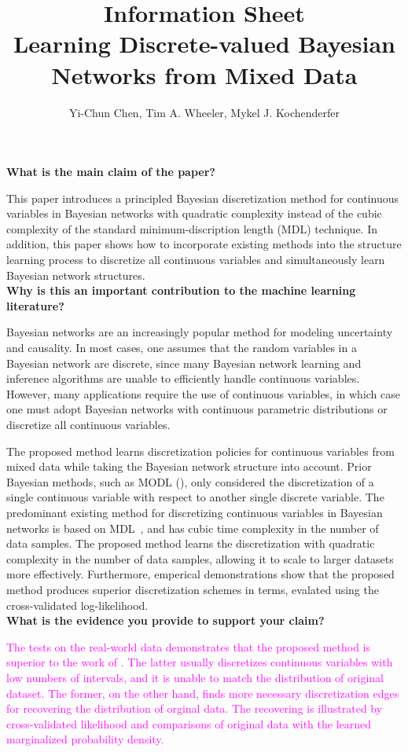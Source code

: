 \documentclass{article}
\title{Information Sheet \\ {\large Learning Discrete-valued Bayesian Networks from Mixed Data}}
\author{\normalsize Yi-Chun Chen, Tim A. Wheeler, Mykel J. Kochenderfer}
\date{}
\newcommand{\todo}[1]{\textcolor{magenta}{#1}}
\begin{document}
\maketitle

\noindent
\textbf{What is the main claim of the paper?}

This paper introduces a principled Bayesian discretization method for continuous variables in Bayesian networks with quadratic complexity instead of the cubic complexity of the standard minimum-discription length (MDL) technique.
In addition, this paper shows how to incorporate existing methods into the structure learning process to discretize all continuous variables and simultaneously learn Bayesian network structures.\\[0em]

\noindent
\textbf{Why is this an important contribution to the machine learning literature?}

Bayesian networks are an increasingly popular method for modeling uncertainty and causality.
In most cases, one assumes that the random variables in a Bayesian network are discrete, since many Bayesian network learning and inference algorithms are unable to efficiently handle continuous variables.
However, many applications require the use of continuous variables, in which case one must adopt Bayesian networks with continuous parametric distributions or discretize all continuous variables.

The proposed method learns discretization policies for continuous variables from mixed data while taking the Bayesian network structure into account.
Prior Bayesian methods, such as MODL (\citep{Boulle_2006, Lustgarten_2011}), only considered the discretization of a single continuous variable with respect to another single discrete variable.
The predominant existing method for discretizing continuous variables in Bayesian networks is based on MDL~\citep{Friedman_1996}, and has cubic time complexity in the number of data samples.
The proposed method learns the discretization with quadratic complexity in the number of data samples, allowing it to scale to larger datasets more effectively.
Furthermore, emperical demonstrations show that the proposed method produces superior discretization schemes in terms, evalated using the cross-validated log-likelihood.\\[0em]

\noindent
\textbf{What is the evidence you provide to support your claim?}

\todo{
The tests on the real-world data \citep{Lichman_2013} demonstrates that the proposed method is superior to the work of \cite{Friedman_1996}. The latter usually discretizes continuous variables with low numbers of intervals, and it is unable to match the distribution of original dataset. The former, on the other hand, finds more necessary discretization edges for recovering the distribution of orginal data. The recovering is illustrated by cross-validated likelihood and comparisons of original data with the learned marginalized probability density.\\[0em]
}
\end{document}
